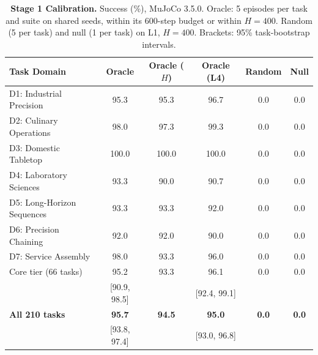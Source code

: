 \documentclass[conference]{IEEEtran}
\begin{document}
\begin{table}[t]
\centering
\caption{\textbf{Stage 1 Calibration.} Success (\%), MuJoCo 3.5.0. Oracle: 5 episodes per task and suite on shared seeds, within its 600-step budget or within $H=400$. Random (5 per task) and null (1 per task) on L1, $H=400$. Brackets: 95\% task-bootstrap intervals.}
\label{tab:prelim_results}
\scriptsize
\setlength{\tabcolsep}{2.4pt}
\renewcommand{\arraystretch}{0.92}
\begin{tabular}{lccccc}
\toprule
\textbf{Task Domain} & \textbf{Oracle} & \textbf{Oracle ($H$)} & \textbf{Oracle (L4)} & \textbf{Random} & \textbf{Null} \\
\midrule
D1: Industrial Precision & 95.3 & 95.3 & 96.7 & 0.0 & 0.0 \\
D2: Culinary Operations & 98.0 & 97.3 & 99.3 & 0.0 & 0.0 \\
D3: Domestic Tabletop & 100.0 & 100.0 & 100.0 & 0.0 & 0.0 \\
D4: Laboratory Sciences & 93.3 & 90.0 & 90.7 & 0.0 & 0.0 \\
D5: Long-Horizon Sequences & 93.3 & 93.3 & 92.0 & 0.0 & 0.0 \\
D6: Precision Chaining & 92.0 & 92.0 & 90.0 & 0.0 & 0.0 \\
D7: Service Assembly & 98.0 & 93.3 & 96.0 & 0.0 & 0.0 \\
\midrule
Core tier (66 tasks) & 95.2 & 93.3 & 96.1 & 0.0 & 0.0 \\
 & {\tiny [90.9, 98.5]} & & {\tiny [92.4, 99.1]} & & \\
\textbf{All 210 tasks} & \textbf{95.7} & \textbf{94.5} & \textbf{95.0} & \textbf{0.0} & \textbf{0.0} \\
 & {\tiny [93.8, 97.4]} & & {\tiny [93.0, 96.8]} & & \\
\bottomrule
\end{tabular}
\end{table}
\end{document}
